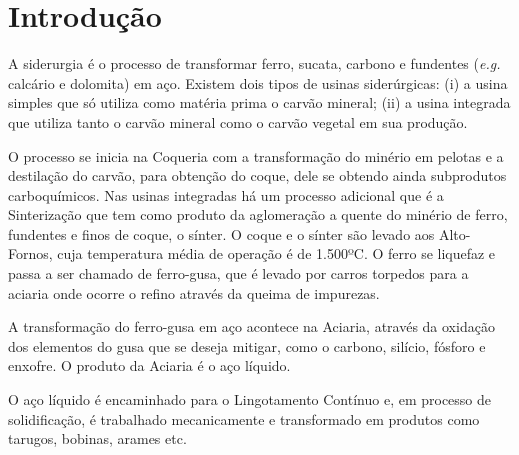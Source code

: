 \chapter[Introdução]{Introdução}

 A siderurgia é o processo de transformar ferro, sucata, carbono e fundentes (\textit{e.g.} calcário e dolomita) em aço. Existem dois tipos de usinas siderúrgicas: (i) a usina simples que só utiliza como matéria prima o carvão mineral; (ii) a usina integrada que utiliza tanto o carvão mineral como o carvão vegetal em sua produção.
 
 O processo se inicia na Coqueria com a transformação do minério em pelotas e a destilação do carvão, para obtenção do coque, dele se obtendo ainda subprodutos carboquímicos.
%
 Nas usinas integradas há um processo adicional que é a Sinterização que tem como produto da aglomeração a quente do minério de ferro, fundentes e finos de coque, o sínter.
%
 O coque e o sínter são levado aos Alto-Fornos, cuja temperatura média de operação é de 1.500ºC. 
%
O ferro se liquefaz e passa a ser chamado de ferro-gusa, que é levado por carros torpedos para a aciaria onde ocorre o refino através da queima de impurezas.
  
A transformação do ferro-gusa em aço acontece na Aciaria, através da oxidação dos elementos do gusa que se deseja mitigar, como o carbono, silício, fósforo e enxofre. 
%
O produto da Aciaria é o aço líquido.

 O aço líquido é encaminhado para o Lingotamento Contínuo e, em processo de solidificação, é trabalhado mecanicamente e transformado em produtos como tarugos, bobinas, arames etc. \cite{aco}

